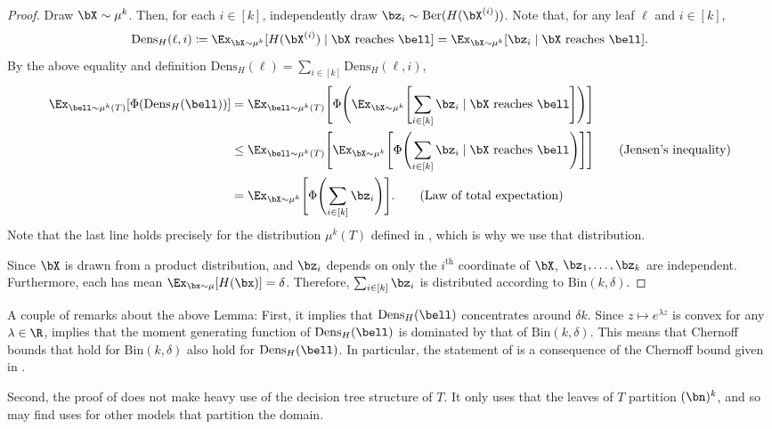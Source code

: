\documentclass[11pt]{article}
\newcommand{\Ber}{\mathrm{Ber}}
\newcommand{\Bin}{\mathrm{Bin}}
\newcommand{\dens}{\mathrm{Dens}}
\DeclarePairedDelimiter\paren{(}{)}
\DeclarePairedDelimiter\bracket{[}{]}
\begin{document}
\begin{proof}
    Draw $\bX \sim \mu^k$. Then, for each $i \in [k]$, independently draw $\bz_i \sim \Ber(H(\bX^{(i)}))$. Note that, for any leaf $\ell$ and $i \in [k]$,
    \begin{equation*}
        \dens_H(\ell, i) \coloneqq \Ex_{\bX \sim \mu^k}[H(\bX^{(i)}) \mid \bX\text{ reaches }\bell] = \Ex_{\bX \sim \mu^k}[\bz_i \mid \bX\text{ reaches }\bell].
    \end{equation*}
    By the above equality and definition $\dens_H(\ell) = \sum_{i \in [k]}\dens_H(\ell,i)$,
    \begin{align*}
        \Ex_{\bell \sim \mu^k(T)}[\Phi(\dens_H(\bell))] &= \Ex_{\bell \sim \mu^k(T)}\bracket[\Bigg]{\Phi\paren[\Bigg]{ \Ex_{\bX \sim \mu^k}\bracket[\Bigg]{\sum_{i \in [k]}\bz_i \mid \bX\text{ reaches }\bell}}}\\
        &\leq \Ex_{\bell \sim \mu^k(T)}\bracket[\Bigg]{\Ex_{\bX \sim \mu^k}\bracket[\Bigg]{\Phi\paren[\Bigg]{ \sum_{i \in [k]}\bz_i \mid \bX\text{ reaches }\bell}}} \tag{Jensen's inequality} \\
        &= \Ex_{\bX \sim \mu^k}\bracket[\Bigg]{\Phi\paren[\Bigg]{ \sum_{i \in [k]}\bz_i}}. \tag{Law of total expectation}
    \end{align*}
    Note that the last line holds precisely for the distribution $\mu^k(T)$ defined in , which is why we use that distribution.

    Since $\bX$ is drawn from a product distribution, and $\bz_i$ depends on only the $i^{\text{th}}$ coordinate of $\bX$, $\bz_1,\ldots, \bz_k$ are independent. Furthermore, each has mean $\Ex_{\bx \sim \mu}[H(\bx)] = \delta$. Therefore, $\sum_{i \in [k]}\bz_i$ is distributed according to $\Bin(k,\delta)$.
\end{proof}
A couple of remarks about the above Lemma: First, it implies that $\dens_H(\bell)$ concentrates around $\delta k$. Since $z \mapsto e^{\lambda z}$ is convex for any $\lambda \in \R$,   implies that the moment generating function of $\dens_H(\bell)$ is dominated by that of $\Bin(k,\delta)$. This means that Chernoff bounds that hold for $\Bin(k,\delta)$ also hold for $\dens_H(\bell)$. In particular, the statement of  is a consequence of the Chernoff bound given in .

Second, the proof of  does not make heavy use of the decision tree structure of $T$. It only uses that the leaves of $T$ partition $(\bn)^k$, and so may find uses for other models that partition the domain.
\end{document}
